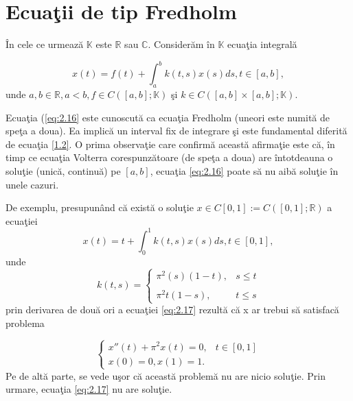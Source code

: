 \documentclass[a4paper,12pt,oneside]{report}
\begin{document}
\section{Ecua\c{t}ii de tip Fredholm}

\^{I}n cele ce urmeaz\u{a} $\mathbb{K}$ este $\mathbb{R}$ sau $\mathbb{C}$. Consider\u{a}m \^{i}n \(\mathbb{K}\) ecua\c{t}ia integral\u{a}

\begin{displaymath}
x\left ( t \right ) = f\left ( t \right ) + \int_{a}^{b}k\left ( t,s \right )x\left ( s \right )ds, t\in \left [ a,b \right ], \label{eq:2.16} \tag{2.16}
\end{displaymath}
unde \(a,b \in \mathbb{R}, a< b, f\in C\left ( \left [ a,b \right ]; \mathbb{K}\right )\) \c{s}i \(k\in C\left ( \left [ a,b \right ] \times \left [ a,b \right ]; \mathbb{K}\right ).\)

 Ecua\c{t}ia (\ref{eq:2.16} este cunoscut\u{a} ca ecua\c{t}ia Fredholm (uneori este numit\u{a} de spe\c{t}a a doua). Ea implic\u{a} un interval fix de integrare \c{s}i este fundamental diferit\u{a} de ecua\c{t}ia \ref{1.2}.  O prima observa\c{t}ie care confirm\u{a} aceast\u{a} afirma\c{t}ie este c\u{a}, \^{i}n timp ce ecua\c{t}ia Volterra corespunz\u{a}toare (de spe\c{t}a a doua) are \^{i}ntotdeauna o solu\c{t}ie (unic\u{a}, continu\u{a}) pe \(\left [ a,b \right ]\), ecua\c{t}ia \ref{eq:2.16} poate s\u{a} nu aib\u{a} solu\c{t}ie \^{i}n unele cazuri.

 De exemplu, presupun\^{a}nd c\u{a} exist\u{a} o solu\c{t}ie \(x \in C\left [ 0,1 \right ] := C\left ( \left [ 0,1 \right ]; \mathbb{R} \right )\) a ecua\c{t}iei
\begin{displaymath}
x\left ( t \right ) = t + \int_{0}^{1} k\left ( t,s \right )x\left ( s \right )ds, t\in \left [ 0,1 \right ], \label{eq:2.17} \tag{2.17}
\end{displaymath}
unde
\begin{displaymath}
k\left ( t,s \right )=\left\{\begin{matrix}
\pi ^{2} \left ( s \right )\left ( 1-t \right ) , & s\leq t\\
& \\ \pi ^{2}t\left ( 1-s \right ),  & t\leq s
\end{matrix}\right.
\end{displaymath}
prin derivarea de dou\u{a} ori a ecua\c{t}iei \ref{eq:2.17}  rezult\u{a} c\u{a} x ar trebui s\u{a} satisfac\u{a} problema

\begin{displaymath}
\left\{\begin{matrix}
{x}'' \left ( t \right ) + \pi ^{2}x\left ( t \right )  = 0, & t \in \left [ 0,1 \right ] \\
x\left ( 0 \right )  =  0, x \left ( 1 \right ) = 1.&
\end{matrix}\right.
\end{displaymath}
Pe de alt\u{a} parte, se vede u\c{s}or c\u{a}  aceast\u{a} problem\u{a} nu are nicio solu\c{t}ie. Prin urmare, ecua\c{t}ia \ref{eq:2.17} nu are solu\c{t}ie.
\end{document}

